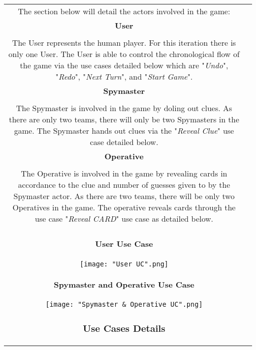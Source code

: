 \documentclass[10pt, a4paper]{article}
\begin{document}
\begin{table}[htbp]
\begin{center}
\begin{tabular}{| c | c |}
		The section below will detail the actors involved in the game: \\
		    
		    \textbf{User} \\
		    \\
		    The User represents the human player. For this iteration there is only one User. The User is able to control the chronological flow of the game via the use cases detailed below which are "\textit{Undo}", "\textit{Redo}", "\textit{Next Turn}", and "\textit{Start Game}".\\
		    
		    \textbf{Spymaster}\\
		    \\
		    The Spymaster is involved in the game by doling out clues. As there are only two teams, there will only be two Spymasters in the game. The Spymaster hands out clues via the "\textit{Reveal Clue}" use case detailed below.\\
		    
		    \textbf{Operative}\\
		    \\
		    The Operative is involved in the game by revealing cards in accordance to the clue and number of guesses given to by the Spymaster actor. As there are two teams, there will be only two Operatives in the game. The operative reveals cards through the use case "\textit{Reveal CARD}" use case as detailed below.\\
		    
		    \clearpage
		
			\paragraph{User Use Case}
			
			\begin{center}
				\texttt{[image: "User UC".png]}
			\end{center} 
			
			\paragraph{Spymaster and Operative Use Case}
			
			\begin{center}
				\texttt{[image: "Spymaster \& Operative UC".png]}
			\end{center}
		
		\subsubsection{Use Cases Details}
		

\end{tabular}
\end{center}
\end{table}
\end{document}
